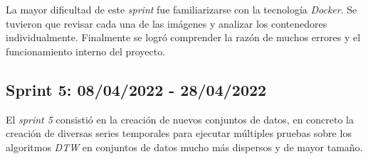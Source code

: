 \begin{table}[H]
\centering
{}
\caption{Tareas del \textit{sprint 4}.}
\label{sprint4}
\end{table}

La mayor dificultad de este \textit{sprint} fue familiarizarse con la tecnología \textit{Docker}. Se tuvieron que revisar cada una de las imágenes y analizar los contenedores individualmente. Finalmente se logró comprender la razón de muchos errores y el funcionamiento interno del proyecto. 

\subsection{Sprint 5: 08/04/2022 - 28/04/2022}
El \textit{sprint 5} consistió en la creación de nuevos conjuntos de datos, en concreto la creación de diversas series temporales para ejecutar múltiples pruebas sobre los algoritmos \textit{DTW} en conjuntos de datos mucho más dispersos y de mayor tamaño.


